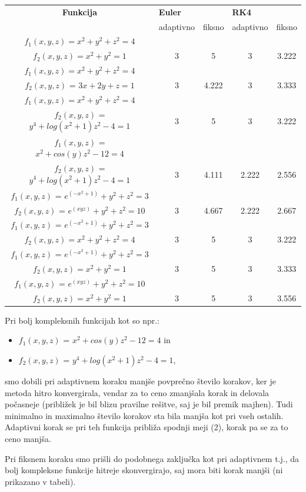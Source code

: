\documentclass[12pt]{article}
\begin{document}
\begin{tabular}{|c | c | c | c | c |} 
 \hline
 \textbf{Funkcija} &\multicolumn{2}{|l|}{\textbf{Euler}} &\multicolumn{2}{|l|}{\textbf{RK4}}\\                
  \small &adaptivno & fiksno & adaptivno & fiksno \\ 
 \hline
 \small{}$f_{1}(x,y,z)=x^{2} + y^{2}+ z^{2}=4$ & & & &\\ 
 \small{}$f_{2}(x,y,z)=x^{2} + y^{2}    =1$  & 3 & 5 & 3 & 3.222 \\
 \hline
 \small{}$f_{1}(x,y,z)=x^{2} + y^{2}+ z^{2}=4$ & & & &\\ 
 \small{}$f_{2}(x,y,z)$ = $3x + 2y + z = 1$  & 3 & 4.222 & 3 & 3.333 \\
 \hline
 \small{}$f_{1}(x,y,z)=x^{2} + y^{2}+ z^{2}=4$ & & & &\\ 
 \small{}$f_{2}(x,y,z)$ = $y^4 + log(x^2 + 1)z^2 - 4 = 1$  & 3 & 5 & 3 & 3.222 \\
 \hline
 \small{}$f_{1}(x,y,z)$ = $x^2 + cos(y)z^2 - 12 = 4$ & & & &\\ 
\small{}$f_{2}(x,y,z)$ = $y^4 + log(x^2 + 1)z^2 - 4 = 1$  & 3 & 4.111 & 2.222 & 2.556 \\
 \hline
 \small{}$f_{1}(x,y,z)$ = $e^{(-x^{2}+1)}+y^{2}+z^{2} = 3$ & & & &\\ 
 \small{}$f_{2}(x,y,z)$ = $e^{(xyz)}+y^{2}+z^{2} = 10$  & 3 & 4.667 & 2.222 & 2.667 \\
 \hline
 \small{}$f_{1}(x,y,z)$ = $e^{(-x^{2}+1)}+y^{2}+z^{2} = 3$ & & & &\\ 
 \small{}$f_{2}(x,y,z)=x^{2} + y^{2}+ z^{2}=4$  & 3 & 5 & 3 & 3.222 \\
 \hline
 \small{}$f_{1}(x,y,z)$ = $e^{(-x^{2}+1)}+y^{2}+z^{2} = 3$ & & & &\\ 
  \small{}$f_{2}(x,y,z)=x^{2} + y^{2}    =1$  & 3 & 5 & 3 & 3.333 \\
  \hline
\small{}$f_{1}(x,y,z)$ = $e^{(xyz)}+y^{2}+z^{2} = 10$ & & & &\\ 
 \small{}$f_{2}(x,y,z)=x^{2} + y^{2}    =1$  & 3 & 5 & 3 & 3.556 \\
  \hline
\end{tabular}
\newline
\newline
Pri bolj kompleksnih funkcijah kot so npr.:
\begin{itemize}
    \item $f_{1}(x,y,z)$ = $x^2 + cos(y)z^2 - 12 = 4$  in \item $f_{2}(x,y,z)$ = $y^4 + log(x^2 + 1)z^2 - 4 = 1$,
\end{itemize}
smo dobili pri adaptivnem koraku manjše povprečno število korakov, ker je metoda hitro konvergirala, vendar za to ceno zmanjšala korak in delovala počasneje (približek je bil blizu pravilne rešitve, saj je bil premik majhen). Tudi minimalno in maximalno število korakov sta bila manjša kot pri vseh ostalih. Adaptivni korak se pri teh funkcija približa spodnji meji (2), korak pa se za to ceno manjša. 
\par Pri fiksnem koraku smo prišli do podobnega zaključka kot pri adaptivnem t.j., da bolj kompleksne funkcije hitreje skonvergirajo, saj mora biti korak manjši (ni prikazano v tabeli).
\end{document}
